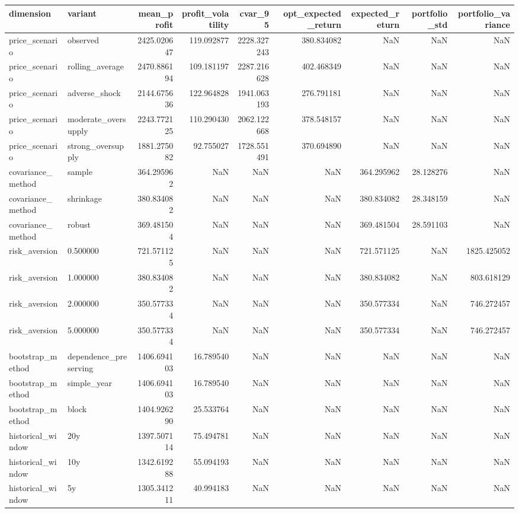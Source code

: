 \begin{tabular}{llrrrrrrr}
\toprule
dimension & variant & mean\_profit & profit\_volatility & cvar\_95 & opt\_expected\_return & expected\_return & portfolio\_std & portfolio\_variance \\
\midrule
price\_scenario & observed & 2425.020647 & 119.092877 & 2228.327243 & 380.834082 & NaN & NaN & NaN \\
price\_scenario & rolling\_average & 2470.886194 & 109.181197 & 2287.216628 & 402.468349 & NaN & NaN & NaN \\
price\_scenario & adverse\_shock & 2144.675636 & 122.964828 & 1941.063193 & 276.791181 & NaN & NaN & NaN \\
price\_scenario & moderate\_oversupply & 2243.772125 & 110.290430 & 2062.122668 & 378.548157 & NaN & NaN & NaN \\
price\_scenario & strong\_oversupply & 1881.275082 & 92.755027 & 1728.551491 & 370.694890 & NaN & NaN & NaN \\
covariance\_method & sample & 364.295962 & NaN & NaN & NaN & 364.295962 & 28.128276 & NaN \\
covariance\_method & shrinkage & 380.834082 & NaN & NaN & NaN & 380.834082 & 28.348159 & NaN \\
covariance\_method & robust & 369.481504 & NaN & NaN & NaN & 369.481504 & 28.591103 & NaN \\
risk\_aversion & 0.500000 & 721.571125 & NaN & NaN & NaN & 721.571125 & NaN & 1825.425052 \\
risk\_aversion & 1.000000 & 380.834082 & NaN & NaN & NaN & 380.834082 & NaN & 803.618129 \\
risk\_aversion & 2.000000 & 350.577334 & NaN & NaN & NaN & 350.577334 & NaN & 746.272457 \\
risk\_aversion & 5.000000 & 350.577334 & NaN & NaN & NaN & 350.577334 & NaN & 746.272457 \\
bootstrap\_method & dependence\_preserving & 1406.694103 & 16.789540 & NaN & NaN & NaN & NaN & NaN \\
bootstrap\_method & simple\_year & 1406.694103 & 16.789540 & NaN & NaN & NaN & NaN & NaN \\
bootstrap\_method & block & 1404.926290 & 25.533764 & NaN & NaN & NaN & NaN & NaN \\
historical\_window & 20y & 1397.507114 & 75.494781 & NaN & NaN & NaN & NaN & NaN \\
historical\_window & 10y & 1342.619288 & 55.094193 & NaN & NaN & NaN & NaN & NaN \\
historical\_window & 5y & 1305.341211 & 40.994183 & NaN & NaN & NaN & NaN & NaN \\
\bottomrule
\end{tabular}
